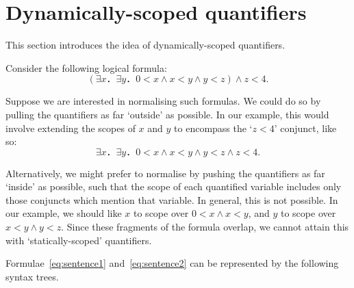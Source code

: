 \documentclass[svgnames]{llncs}
\begin{document}
\clearpage

\section{Dynamically-scoped quantifiers}\label{sect:dynamically_scoped_quantifiers}

This section introduces the idea of dynamically-scoped quantifiers.

Consider the following logical formula:
\begin{equation}
\label{eq:sentence1}
(∃x．∃y．0<x ∧ x<y ∧ y<z) ∧ z<4.
\end{equation}

\noindent Suppose we are interested in normalising such formulas. We could do so by pulling the quantifiers as far `outside' as possible. In our example, this would involve extending the scopes of $x$ and $y$ to encompass the `$z<4$' conjunct, like so:
\begin{equation}
\label{eq:sentence2}
∃x．∃y．0<x ∧ x<y ∧ y<z ∧ z<4.
\end{equation}

\noindent Alternatively, we might prefer to normalise by pushing the quantifiers as far `inside' as possible, such that the scope of each quantified variable includes only those conjuncts which mention that variable. In general, this is not possible. In our example, we should like $x$ to scope over $0<x ∧ x<y$, and $y$ to scope over $x<y ∧ y<z$. Since these fragments of the formula overlap, we cannot attain this with `statically-scoped' quantifiers.

Formulae~\eqref{eq:sentence1} and~\eqref{eq:sentence2} can be represented by the following syntax trees.




\begin{center}
\end{center}
\end{document}

